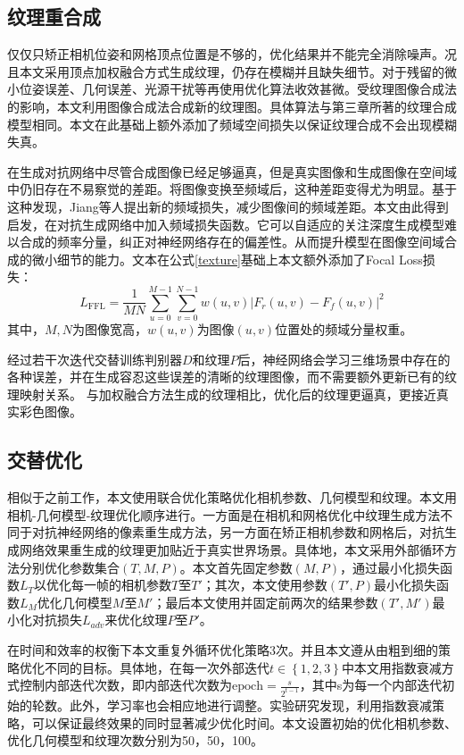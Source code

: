 \subsection{纹理重合成}
仅仅只矫正相机位姿和网格顶点位置是不够的，优化结果并不能完全消除噪声。况且本文采用顶点加权融合方式生成纹理，仍存在模糊并且缺失细节。对于残留的微小位姿误差、几何误差、光源干扰等再使用优化算法收效甚微。受纹理图像合成法的影响，本文利用图像合成法合成新的纹理图。具体算法与第三章所著的纹理合成模型相同。本文在此基础上额外添加了频域空间损失以保证纹理合成不会出现模糊失真。\par

在生成对抗网络中尽管合成图像已经足够逼真，但是真实图像和生成图像在空间域中仍旧存在不易察觉的差距。将图像变换至频域后，这种差距变得尤为明显。基于这种发现，Jiang等人提出新的频域损失，减少图像间的频域差距。本文由此得到启发，在对抗生成网络中加入频域损失函数。它可以自适应的关注深度生成模型难以合成的频率分量，纠正对神经网络存在的偏差性。从而提升模型在图像空间域合成的微小细节的能力。文本在公式\eqref{texture}基础上本文额外添加了Focal Loss损失：
\begin{equation}
	L_\mathrm{FFL}=\frac{1}{M N} \sum_{u=0}^{M-1} \sum_{v=0}^{N-1} w(u, v)\left|F_{r}(u,v)-F_{f}(u, v)\right|^{2}
\end{equation}
其中，$M,N$为图像宽高，$w(u,v)$为图像$(u,v)$位置处的频域分量权重。\par
经过若干次迭代交替训练判别器$D$和纹理$P$后，神经网络会学习三维场景中存在的各种误差，并在生成容忍这些误差的清晰的纹理图像，而不需要额外更新已有的纹理映射关系。 与加权融合方法生成的纹理相比，优化后的纹理更逼真，更接近真实彩色图像。\par

\subsection{交替优化}
相似于之前工作，本文使用联合优化策略优化相机参数、几何模型和纹理。本文用相机-几何模型-纹理优化顺序进行。一方面是在相机和网格优化中纹理生成方法不同于对抗神经网络的像素重生成方法，另一方面在矫正相机参数和网格后，对抗生成网络效果重生成的纹理更加贴近于真实世界场景。具体地，本文采用外部循环方法分别优化参数集合$(T,M,P)$。本文首先固定参数$(M,P)$，通过最小化损失函数$L_T$以优化每一帧的相机参数$T$至$T'$；其次，本文使用参数$(T',P)$最小化损失函数$L_M$优化几何模型$M$至$M'$；最后本文使用并固定前两次的结果参数$(T',M')$最小化对抗损失$L_{adv}$来优化纹理$P$至$P'$。\par
在时间和效率的权衡下本文重复外循环优化策略3次。并且本文遵从由粗到细的策略优化不同的目标。具体地，在每一次外部迭代$t\in \left \{ 1,2,3 \right \}$中本文用指数衰减方式控制内部迭代次数，即内部迭代次数为$\text{epoch}  =\frac{s}{2^{t-1}}$，其中s为每一个内部迭代初始的轮数。此外，学习率也会相应地进行调整。实验研究发现，利用指数衰减策略，可以保证最终效果的同时显著减少优化时间。本文设置初始的优化相机参数、优化几何模型和纹理次数分别为50，50，100。

